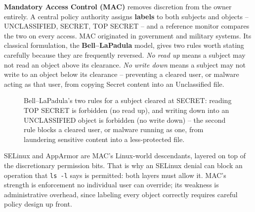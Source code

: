 \textbf{Mandatory Access Control (MAC)} removes discretion from the owner entirely. A central
policy authority assigns \textbf{labels} to both subjects and objects -- UNCLASSIFIED, SECRET, TOP
SECRET -- and a reference monitor compares the two on every access. MAC originated in government and
military systems. Its classical formulation, the \textbf{Bell--LaPadula} model, gives two rules
worth stating carefully because they are frequently reversed. \emph{No read up} means a subject may
not read an object above its clearance. \emph{No write down} means a subject may not write to an
object below its clearance -- preventing a cleared user, or malware acting as that user, from
copying Secret content into an Unclassified file. \begin{figure}[h]
\centering
{}
\caption{Bell--LaPadula's two rules for a subject cleared at SECRET: reading TOP SECRET is
forbidden (no read up), and writing down into an UNCLASSIFIED object is forbidden (no write down)
-- the second rule blocks a cleared user, or malware running as one, from laundering sensitive
content into a less-protected file.}
\label{fig:5.2-bell-lapadula}
\end{figure}

SELinux and AppArmor are MAC's Linux-world descendants,
layered on top of the discretionary permission bits. That is why an SELinux denial can block an
operation that \texttt{ls -l} says is permitted: both layers must allow it. MAC's strength is
enforcement no individual user can override; its weakness is administrative overhead, since labeling
every object correctly requires careful policy design up front.

